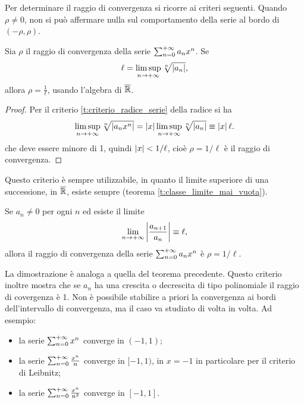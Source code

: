 Per determinare il raggio di convergenza si ricorre ai criteri seguenti.
Quando $\rho\neq 0$, non si può affermare nulla sul comportamento della serie al bordo di $(-\rho,\rho)$.
\begin{teorema}
Sia $\rho$ il raggio di convergenza della serie $\sum_{{n}=0}^{+\infty}a_nx^n$. Se
\[
\ell=\limsup_{n\to+\infty}\sqrt[n]{\left|{a_n}\right|},
\]
allora $\rho=\frac1{\ell}$, usando l'algebra di $\overline{\mathbb{R}}$.
\end{teorema}
\begin{proof}
Per il criterio \ref{t:criterio_radice_serie} della radice si ha
\[
\limsup_{n\to+\infty}\sqrt[n]{\left|{a_nx^n}\right|}=\left|{x}\right|\limsup_{n\to+\infty}\sqrt[n]{\left|{a_n}\right|}\equiv \left|{x}\right|\ell.
\]
che deve essere minore di 1, quindi $\left|{x}\right|<1/\ell$, cioè $\rho=1/\ell$ è il raggio di convergenza.
\end{proof}
Questo criterio è sempre utilizzabile, in quanto il limite superiore di una successione, in $\overline{\mathbb{R}}$, esiste sempre (teorema \ref{t:classe_limite_mai_vuota}).
\begin{teorema}
Se $a_n\neq 0$ per ogni $n$ ed esiste il limite
\[
\lim_{n\to+\infty}\left|{\frac{a_{n+1}}{a_n}}\right|\equiv\ell,
\]
allora il raggio di convergenza della serie $\sum_{{n}=0}^{+\infty}a_nx^n$ è $\rho=1/\ell$.
\end{teorema}
La dimostrazione è analoga a quella del teorema precedente. Questo criterio inoltre mostra che se $a_n$ ha una crescita o decrescita di tipo polinomiale il raggio di covergenza è 1.
Non è possibile stabilire a priori la convergenza ai bordi dell'intervallo di convergenza, ma il caso va studiato di volta in volta. Ad esempio:
\begin{itemize}
\item la serie $\sum_{{n}=0}^{+\infty}x^n$ converge in $(-1,1)$;
\item la serie $\sum_{{n}=0}^{+\infty}\frac{x^n}{n}$ converge in $[-1,1)$, in $x=-1$ in particolare per il criterio di Leibnitz;
\item la serie $\sum_{{n}=0}^{+\infty}\frac{x^n}{n^2}$ converge in $[-1,1]$.
\end{itemize}


